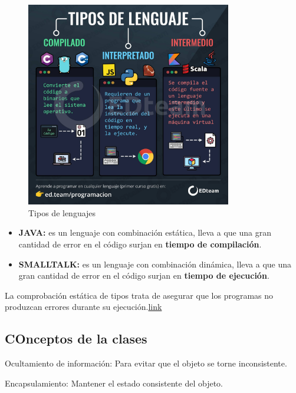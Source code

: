 \documentclass[../main.tex]{subfiles}
\begin{document}
        \begin{figure}[h]
            \centering
            \includegraphics[width=0.8\textwidth]{../images/lenguajes.jpeg}
            \caption{Tipos de lenguajes}
            \label{fig:tipos_lenguajes}
        \end{figure}

        \begin{itemize}
            \item \textbf{JAVA:} es un lenguaje con combinación estática, lleva a que una gran cantidad de error en el código surjan en \textbf{tiempo de compilación}.
            \item \textbf{SMALLTALK:} es un lenguaje con combinación dinámica, lleva a que una gran cantidad de error en el código surjan en \textbf{tiempo de ejecución}.
        \end{itemize}

        La comprobación estática de tipos trata de asegurar que los programas no produzcan errores durante su ejecución.\href{https://babel.ls.fi.upm.es/prole2013/miguel_garcia_rodriguez.pdf}{link}


    \subsection{COnceptos de la clases}
        Ocultamiento de información: Para evitar que el objeto se torne inconsistente.

        Encapsulamiento: Mantener el estado consistente del objeto.
\end{document}
